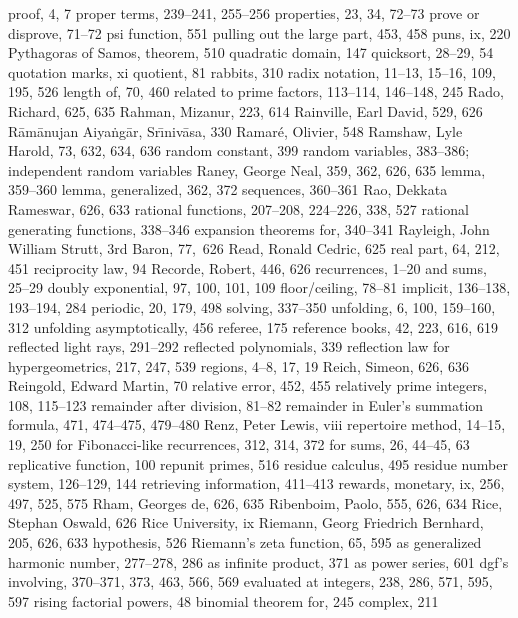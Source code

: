 proof, 4, 7
proper terms, 239--241, 255--256
properties, 23, 34, 72--73
prove or disprove, 71--72
psi function, 551
pulling out the large part, 453, 458
puns, ix, 220
Pythagoras of Samos, theorem, 510
\medskip
quadratic domain, 147
quicksort, 28--29, 54
quotation marks, xi
quotient, 81
\medskip
rabbits, 310
radix notation, 11--13, 15--16, 109, 195, 526
\sub length of, 70, 460
\sub related to prime factors, 113--114, 146--148, 245
Rado, Richard, 625, 635
Rahman, Mizanur, 223, 614
Rainville, Earl David, 529, 626
R\=am\=anujan Aiya\.ng\=ar, Sr\=\i niv\=asa, 330
Ramar\'e, Olivier, 548
Ramshaw, Lyle Harold, 73, 632, 634, 636
random constant, 399
random variables, 383--386; \also independent random variables
Raney, George Neal, 359, 362, 626, 635
\sub lemma, 359--360
\sub lemma, generalized, 362, 372
\sub sequences, 360--361
Rao, Dekkata Rameswar, 626, 633
rational functions, 207--208, 224--226, 338, 527
rational generating functions, 338--346
\sub expansion theorems for, 340--341
Rayleigh, John William Strutt, 3rd Baron, 77,~626
Read, Ronald Cedric, 625
real part, 64, 212, 451
reciprocity law, 94
Recorde, Robert, 446, 626
recurrences, 1--20
\sub and sums, 25--29
\sub doubly exponential, 97, 100, 101, 109
\sub floor/ceiling, 78--81
\sub implicit, 136--138, 193--194, 284
\sub periodic, 20, 179, 498
\sub solving, 337--350
\sub unfolding, 6, 100, 159--160, 312
\sub unfolding asymptotically, 456
referee, 175
reference books, 42, 223, 616, 619
reflected light rays, 291--292
reflected polynomials, 339
reflection law for hypergeometrics, 217, 247, 539
regions, 4--8, 17, 19
Reich, Simeon, 626, 636
Reingold, Edward Martin, 70
relative error, 452, 455
relatively prime integers, 108, 115--123
remainder after division, 81--82
remainder in Euler's summation formula, 471, 474--475, 479--480
Renz, Peter Lewis, viii
repertoire method, 14--15, 19, 250
\sub for Fibonacci-like recurrences, 312, 314, 372
\sub for sums, 26, 44--45, 63
replicative function, 100
repunit primes, 516
residue calculus, 495
residue number system, 126--129, 144
retrieving information, 411--413
rewards, monetary, ix, 256, 497, 525, 575
Rham, Georges de, 626, 635
Ribenboim, Paolo, 555, 626, 634
Rice, Stephan Oswald, 626
Rice University, ix
Riemann, Georg Friedrich Bernhard, 205, 626, 633
\sub hypothesis, 526
Riemann's zeta function, 65, 595
\sub as generalized harmonic number, 277--278, 286
\sub as infinite product, 371
\sub as power series, 601
\sub dgf's involving, 370--371, 373, 463, 566, 569
\sub evaluated at integers, 238, 286, 571, 595, 597
rising factorial powers, 48
\sub binomial theorem for, 245
\sub complex, 211
